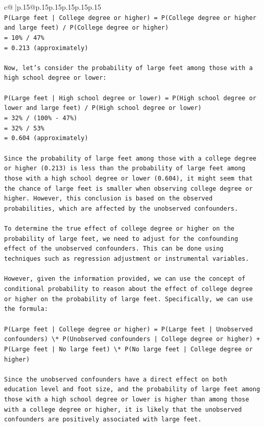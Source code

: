 \documentclass{article}
\begin{document}
{\begin{supertabular}{c@{$\;$}|p{.15\linewidth}@{}p{.15\linewidth}p{.15\linewidth}p{.15\linewidth}p{.15\linewidth}p{.15\linewidth}}
{{{\\ 
\texttt{P(Large feet | College degree or higher) = P(College degree or higher and large feet) / P(College degree or higher)} \\
\texttt{= 10\% / 47\%} \\
\texttt{= 0.213 (approximately)} \\
\\ 
\texttt{Now, let's consider the probability of large feet among those with a high school degree or lower:} \\
\\ 
\texttt{P(Large feet | High school degree or lower) = P(High school degree or lower and large feet) / P(High school degree or lower)} \\
\texttt{= 32\% / (100\% {-} 47\%)} \\
\texttt{= 32\% / 53\%} \\
\texttt{= 0.604 (approximately)} \\
\\ 
\texttt{Since the probability of large feet among those with a college degree or higher (0.213) is less than the probability of large feet among those with a high school degree or lower (0.604), it might seem that the chance of large feet is smaller when observing college degree or higher. However, this conclusion is based on the observed probabilities, which are affected by the unobserved confounders.} \\
\\ 
\texttt{To determine the true effect of college degree or higher on the probability of large feet, we need to adjust for the confounding effect of the unobserved confounders. This can be done using techniques such as regression adjustment or instrumental variables.} \\
\\ 
\texttt{However, given the information provided, we can use the concept of conditional probability to reason about the effect of college degree or higher on the probability of large feet. Specifically, we can use the formula:} \\
\\ 
\texttt{P(Large feet | College degree or higher) = P(Large feet | Unobserved confounders) \textbackslash{}* P(Unobserved confounders | College degree or higher) + P(Large feet | No large feet) \textbackslash{}* P(No large feet | College degree or higher)} \\
\\ 
\texttt{Since the unobserved confounders have a direct effect on both education level and foot size, and the probability of large feet among those with a high school degree or lower is higher than among those with a college degree or higher, it is likely that the unobserved confounders are positively associated with large feet.} \\
}}}
\end{supertabular}}
\end{document}
